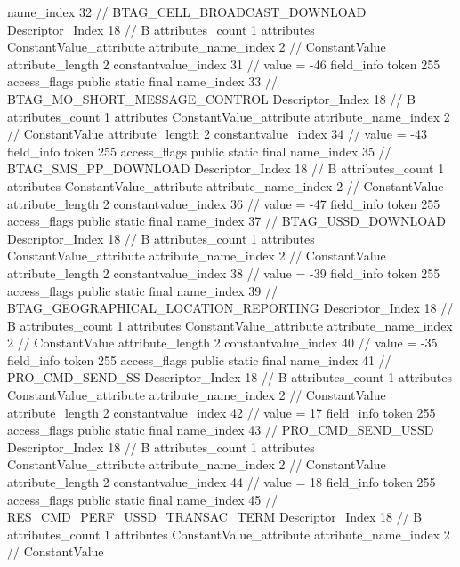 {{{{{				name_index	32		// BTAG_CELL_BROADCAST_DOWNLOAD
				Descriptor_Index	18		// B
				attributes_count	1
				attributes {
				ConstantValue_attribute {
					attribute_name_index	2		// ConstantValue
					attribute_length	2
					constantvalue_index	31		// value = -46
				}
				}
			}
			field_info {
				token	255
				access_flags	public static final
				name_index	33		// BTAG_MO_SHORT_MESSAGE_CONTROL
				Descriptor_Index	18		// B
				attributes_count	1
				attributes {
				ConstantValue_attribute {
					attribute_name_index	2		// ConstantValue
					attribute_length	2
					constantvalue_index	34		// value = -43
				}
				}
			}
			field_info {
				token	255
				access_flags	public static final
				name_index	35		// BTAG_SMS_PP_DOWNLOAD
				Descriptor_Index	18		// B
				attributes_count	1
				attributes {
				ConstantValue_attribute {
					attribute_name_index	2		// ConstantValue
					attribute_length	2
					constantvalue_index	36		// value = -47
				}
				}
			}
			field_info {
				token	255
				access_flags	public static final
				name_index	37		// BTAG_USSD_DOWNLOAD
				Descriptor_Index	18		// B
				attributes_count	1
				attributes {
				ConstantValue_attribute {
					attribute_name_index	2		// ConstantValue
					attribute_length	2
					constantvalue_index	38		// value = -39
				}
				}
			}
			field_info {
				token	255
				access_flags	public static final
				name_index	39		// BTAG_GEOGRAPHICAL_LOCATION_REPORTING
				Descriptor_Index	18		// B
				attributes_count	1
				attributes {
				ConstantValue_attribute {
					attribute_name_index	2		// ConstantValue
					attribute_length	2
					constantvalue_index	40		// value = -35
				}
				}
			}
			field_info {
				token	255
				access_flags	public static final
				name_index	41		// PRO_CMD_SEND_SS
				Descriptor_Index	18		// B
				attributes_count	1
				attributes {
				ConstantValue_attribute {
					attribute_name_index	2		// ConstantValue
					attribute_length	2
					constantvalue_index	42		// value = 17
				}
				}
			}
			field_info {
				token	255
				access_flags	public static final
				name_index	43		// PRO_CMD_SEND_USSD
				Descriptor_Index	18		// B
				attributes_count	1
				attributes {
				ConstantValue_attribute {
					attribute_name_index	2		// ConstantValue
					attribute_length	2
					constantvalue_index	44		// value = 18
				}
				}
			}
			field_info {
				token	255
				access_flags	public static final
				name_index	45		// RES_CMD_PERF_USSD_TRANSAC_TERM
				Descriptor_Index	18		// B
				attributes_count	1
				attributes {
				ConstantValue_attribute {
					attribute_name_index	2		// ConstantValue
}}}}}}}
